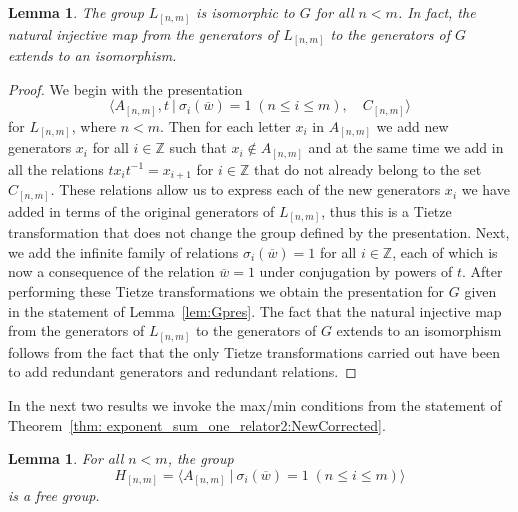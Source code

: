 \documentclass[11pt]{amsart}
\newcommand{\Gpres}[2]{\bigl\langle #1\:|\:#2 \bigr\rangle}
\theoremstyle{plain}
\newtheorem{lemma}[theorem]{Lemma}
\theoremstyle{definition}
\begin{document}
\begin{lemma}\label{lem:isomL} 
The group $L_{[n,m]}$ is isomorphic to $G$ for all $n < m$. 
In fact, the natural injective map from the generators of $L_{[n,m]}$ to the generators of $G$ extends to an isomorphism.
\end{lemma}

\begin{proof}
We begin with the presentation 
\[\Gpres{A_{[n,m]}, t }{ \sigma_i(\overline{w}) = 1 \; (n \leq i \leq m), \quad C_{[n,m]} } \]
for $L_{[n,m]}$, where $n < m$. Then for each letter $x_i$ in $A_{[n,m]}$ we add new generators $x_i$ for all $i \in \mathbb{Z}$ such that $x_i \not\in A_{[n,m]}$ and at the same time we add in all the relations $tx_i t^{-1} = x_{i+1}$ for $i \in \mathbb{Z}$ that do not already belong to the set $C_{[n,m]}$. These relations allow us to express each of the new generators $x_i$ we have added in terms of the original generators of $L_{[n,m]}$, thus this is a Tietze transformation that does not change the group defined by the presentation.   
Next, we add the infinite family of relations $\sigma_i(\overline{w}) = 1$ for all $i \in \mathbb{Z}$, each of which is now a consequence of the relation $\overline{w} =1$ under conjugation by powers of $t$. After performing these Tietze transformations we obtain the presentation for $G$ given in the statement of Lemma~\ref{lem:Gpres}. 
The fact that the natural injective map from the generators of $L_{[n,m]}$ to the generators of $G$ extends to an isomorphism follows from the fact that the only Tietze transformations carried out have been to add redundant generators and redundant relations.  
\end{proof}


In the next two results we invoke the max/min conditions from the statement of Theorem~\ref{thm: exponent_sum_one_relator2:NewCorrected}. 


\begin{lemma}\label{lem:free:group}
For all $n < m$, the group
\[
H_{[n,m]} = \Gpres{A_{[n,m]}}{\sigma_i(\overline{w}) = 1 \; (n \leq i \leq m)}
\]
is a free group.
\end{lemma}
\end{document}
